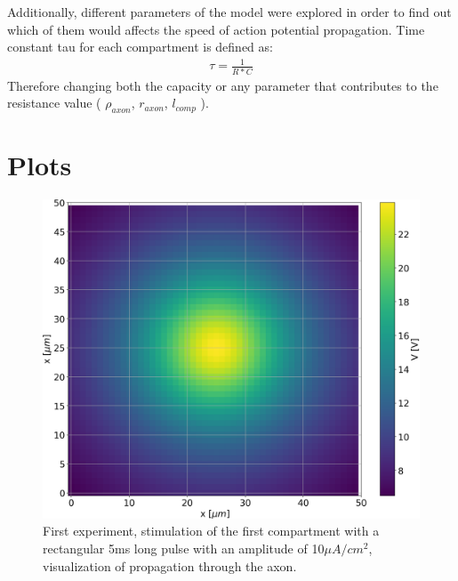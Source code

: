 \documentclass{scrartcl}			%
\begin{document}
Additionally, different parameters of the model were explored in order to find out which of them would affects the speed of action potential propagation. Time constant tau for each compartment is defined as:
\begin{align}
\tau = \frac{1}{R * C}
\end{align}
Therefore changing both the capacity or any parameter that contributes to the resistance value ( $\rho_{axon}$, $r_{axon}$, $l_{comp}$ ).

\newpage
\section{Plots}
\begin{figure}[hbpt!]					%
	\begin{flushleft}
		\hspace*{-0.3in}
		\includegraphics[scale=0.53]{1.png}
		\captionsetup{width=\linewidth}  %
		\caption{First experiment, stimulation of the first compartment with a rectangular 5ms long pulse with an amplitude of 10$\mu A/cm^2$, visualization of propagation through the axon.}		
		\label{fig1} %
	\end{flushleft}
\end{figure}
\end{document}
